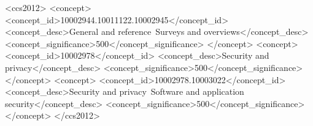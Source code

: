 
\begin{CCSXML}
    <ccs2012>
    <concept>
        <concept_id>10002944.10011122.10002945</concept_id>
        <concept_desc>General and reference~Surveys and overviews</concept_desc>
        <concept_significance>500</concept_significance>
    </concept>
    <concept>
        <concept_id>10002978</concept_id>
        <concept_desc>Security and privacy</concept_desc>
        <concept_significance>500</concept_significance>
    </concept>
    <concept>
        <concept_id>10002978.10003022</concept_id>
        <concept_desc>Security and privacy~Software and application security</concept_desc>
        <concept_significance>500</concept_significance>
    </concept>
    </ccs2012>
\end{CCSXML}


